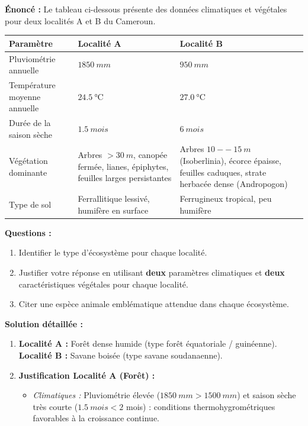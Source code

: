 \documentclass[11pt]{article}
\newcommand{\cle}[1]{{\popxbold\color{popdark}#1}}
\begin{document}
\begin{exoresolu}
    \textbf{Énoncé :} Le tableau ci-dessous présente des données climatiques et végétales pour deux localités A et B du Cameroun.
    \begin{center}
    \begin{tabularx}{\linewidth}{|l|X|X|}\hline
    \rowcolor{popblueL} \textbf{Paramètre} & \textbf{Localité A} & \textbf{Localité B} \\ \hline
    Pluviométrie annuelle & $\SI{1850}{mm}$ & $\SI{950}{mm}$ \\ \hline
    Température moyenne annuelle & $\SI{24,5}{\celsius}$ & $\SI{27,0}{\celsius}$ \\ \hline
    Durée de la saison sèche & $\SI{1,5}{mois}$ & $\SI{6}{mois}$ \\ \hline
    Végétation dominante & Arbres $> \SI{30}{m}$, canopée fermée, lianes, épiphytes, feuilles larges persistantes & Arbres $\SI{10}{--}\SI{15}{m}$ (Isoberlinia), écorce épaisse, feuilles caduques, strate herbacée dense (Andropogon) \\ \hline
    Type de sol & Ferrallitique lessivé, humifère en surface & Ferrugineux tropical, peu humifère \\ \hline
    \end{tabularx}
    \end{center}
    \textbf{Questions :}
    \begin{enumerate}
        \item Identifier le type d'écosystème pour chaque localité.
        \item Justifier votre réponse en utilisant \textbf{deux} paramètres climatiques et \textbf{deux} caractéristiques végétales pour chaque localité.
        \item Citer une espèce animale emblématique attendue dans chaque écosystème.
    \end{enumerate}
    \tcblower
    \textbf{Solution détaillée :}
    \begin{enumerate}
        \item \textbf{Localité A :} \cle{Forêt dense humide} (type forêt équatoriale / guinéenne).\\
              \textbf{Localité B :} \cle{Savane boisée} (type savane soudanaenne).
        \item \textbf{Justification Localité A (Forêt) :}
              \begin{itemize}
                  \item \textit{Climatiques :} Pluviométrie élevée ($\SI{1850}{mm} > \SI{1500}{mm}$) et saison sèche très courte ($\SI{1,5}{mois} < 2$ mois) : conditions thermohygrométriques favorables à la croissance continue.

\end{itemize}
\end{enumerate}
\end{exoresolu}
\end{document}
